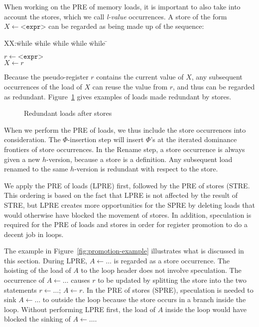 When working on the PRE of memory loads, it is important to also take into account the stores, which we call \emph{l-value} occurrences. 
A store of the form $X \leftarrow \texttt{<expr>}$ can be regarded as being made up of the sequence:
\begin{tabbing}
XX:\= while \= while \= while \= while \= while \= \kill

\> \> $r \leftarrow \texttt{<expr>}$ \\
\> \> $X \leftarrow r$ \\
\end{tabbing}
Because the pseudo-register $r$ contains the current value of $X$, any subsequent occurrences of the load of $X$ can reuse the value from $r$, and thus can be regarded as redundant. 
Figure~\ref{fig:lval-occur} gives examples of loads made redundant by stores.

\begin{figure}
\centering
\hfill
{}
\caption{Redundant loads after stores}
\label{fig:lval-occur}
\end{figure}

When we perform the PRE of loads, we thus include the store occurrences into consideration. 
The $\Phi$-insertion step will insert $\Phi$'s at the iterated dominance frontiers of store occurrences. 
In the Rename step, a store occurrence is always given a new $h$-version, because a store is a definition. 
Any subsequent load renamed to the same $h$-version is redundant with respect to the store.

We apply the PRE of loads (LPRE) first, followed by the PRE of stores (STRE. 
This ordering is based on the fact that LPRE is not affected by the result of STRE, but LPRE creates more opportunities for the SPRE by deleting loads that would otherwise have blocked the movement of stores. 
In addition, speculation is required for the PRE of loads and stores in order for register promotion to do a decent job in loops.

The example in Figure~\ref{fig:promotion-example} illustrates what is discussed in this section. 
During LPRE, $A\gets \dots$ is regarded as a store occurrence. 
The hoisting of the load of $A$ to the loop header does not involve speculation. 
The occurrence of $A\gets\dots$ causes $r$ to be updated by splitting the store into the two statements $r\gets\dots$; $A \gets r$. 
In the PRE of stores (SPRE), speculation is needed to sink $A\gets \dots$ to outside the loop because the store occurs in a branch inside the loop. 
Without performing LPRE first, the load of $A$ inside the loop would have blocked the sinking of $A\gets \dots$.


